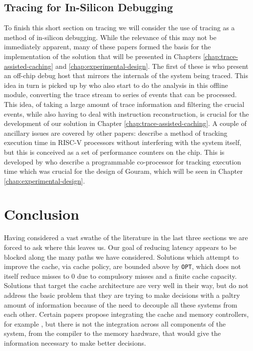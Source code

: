 \subsection{Tracing for In-Silicon Debugging}

To finish this short section on tracing we will consider the use of tracing as a method of in-silicon debugging. While the relevance of this may not be immediately apparent, many of these papers formed the basis for the implementation of the solution that will be presented in Chapters \ref{chap:trace-assisted-caching} and \ref{chap:experimental-design}. The first of these is \citet{uzelacHardwareBasedLoadValue2013} who present an off-chip debug host that mirrors the internals of the system being traced. This idea in turn is picked up by \citet{deckerOnlineAnalysisDebug2018} who also start to do the analysis in this offline module, converting the trace stream to series of events that can be processed. This idea, of taking a large amount of trace information and filtering the crucial events, while also having to deal with instruction reconstruction, is crucial for the development of our solution in Chapter \ref{chap:trace-assisted-caching}. A couple of ancillary issues are covered by other papers: \citet{scheipelSystemAwarePerformanceMonitoring2017} describe a method of tracking execution time in RISC-V processors without interfering with the system itself, but this is conceived as a set of performance counters on the chip. This is developed by \citet{delshadtehraniNileProgrammableMonitoring2018} who describe a programmable co-processor for tracking execution time which was crucial for the design of Gouram, which will be seen in Chapter \ref{chap:experimental-design}. 

\section{Conclusion}

Having considered a vast swathe of the literature in the last three sections we are forced to ask where this leaves us. Our goal of reducing latency appears to be blocked along the many paths we have considered. Solutions which attempt to improve the cache, via cache policy, are bounded above by \texttt{OPT}, which does not itself reduce misses to 0 due to compulsory misses and a finite cache capacity. Solutions that target the cache architecture are very well in their way, but do not address the basic problem that they are trying to make decisions with a paltry amount of information because of the need to decouple all these systems from each other. Certain papers propose integrating the cache and memory controllers, for example \cite{stuecheliCoordinatingDRAMLastLevelCache2011}, but there is not the integration across all components of the system, from the compiler to the memory hardware, that would give the information necessary to make better decisions.

